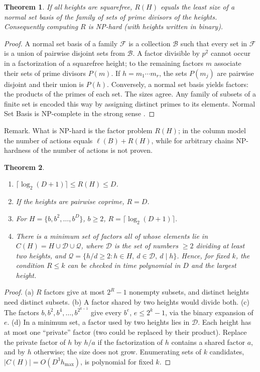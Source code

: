 \documentclass[11pt,a4paper]{article}
\theoremstyle{plain}
\newtheorem{theorem}{Theorem}
\theoremstyle{definition}
\theoremstyle{remark}
\begin{document}
\begin{theorem}\label{thm:np}
If all heights are squarefree, $R(H)$ equals the least size of a normal set basis of the family of sets of prime divisors of the heights. Consequently computing $R$ is NP-hard (with heights written in binary).
\end{theorem}
\begin{proof}
A normal set basis of a family $\mathcal F$ is a collection $\mathcal B$ such that every set in $\mathcal F$ is a union of pairwise disjoint sets from $\mathcal B$. A factor divisible by $p^2$ cannot occur in a factorization of a squarefree height; to the remaining factors $m$ associate their sets of prime divisors $P(m)$. If $h=m_1\cdots m_r$, the sets $P(m_j)$ are pairwise disjoint and their union is $P(h)$. Conversely, a normal set basis yields factors: the products of the primes of each set. The sizes agree. Any family of subsets of a finite set is encoded this way by assigning distinct primes to its elements. Normal Set Basis is NP-complete in the strong sense \cite{jiang}.
\end{proof}
\noindent Remark. What is NP-hard is the factor problem $R(H)$; in the column model the number of actions equals $\ell(B)+R(H)$, while for arbitrary chains NP-hardness of the number of actions is not proven.

\begin{theorem}\label{thm:R}
\begin{enumerate}[label=\upshape(\alph*)]
\item $\lceil\log_2(D+1)\rceil\le R(H)\le D$.
\item If the heights are pairwise coprime, $R=D$.
\item For $H=\{b,b^2,\dots,b^D\}$, $b\ge2$, $R=\lceil\log_2(D+1)\rceil$.
\item There is a minimum set of factors all of whose elements lie in $C(H)=H\cup\mathcal D\cup\mathcal Q$, where $\mathcal D$ is the set of numbers $\ge2$ dividing at least two heights, and $\mathcal Q=\{h/d\ge2: h\in H,\ d\in\mathcal D,\ d\mid h\}$. Hence, for fixed $k$, the condition $R\le k$ can be checked in time polynomial in $D$ and the largest height.
\end{enumerate}
\end{theorem}
\begin{proof}
(a) $R$ factors give at most $2^R-1$ nonempty subsets, and distinct heights need distinct subsets. (b) A factor shared by two heights would divide both. (c) The factors $b,b^2,b^4,\dots,b^{2^{k-1}}$ give every $b^e$, $e\le 2^k-1$, via the binary expansion of $e$. (d) In a minimum set, a factor used by two heights lies in $\mathcal D$. Each height has at most one ``private'' factor (two could be replaced by their product). Replace the private factor of $h$ by $h/a$ if the factorization of $h$ contains a shared factor $a$, and by $h$ otherwise; the size does not grow. Enumerating sets of $k$ candidates, $|C(H)|=O(D^3h_{\max})$, is polynomial for fixed $k$.
\end{proof}
\end{document}
